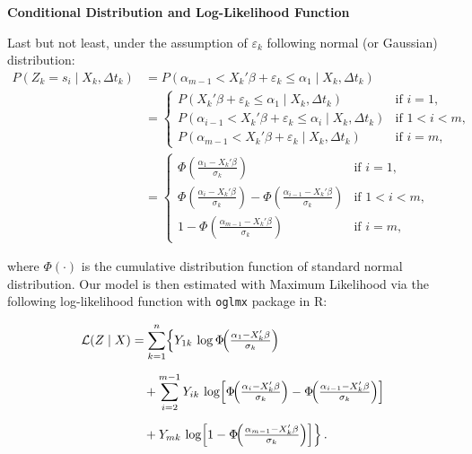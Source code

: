 {\noindent\bfseries Conditional Distribution and Log-Likelihood Function}

Last but not least, under the assumption of \(\varepsilon_k \) following normal (or Gaussian) distribution:
\begin{align}
P(Z_k = s_i \mid X_k, \Delta t_k) &= P(\alpha_{m-1} < X_k'\beta+ \varepsilon_k \leq \alpha_1 \mid X_k, \Delta t_k) \\
&=
\begin{cases}
P(X_k' \beta + \varepsilon_k \leq \alpha_1 \mid X_k, \Delta t_k) & \text{if } i = 1, \\
P(\alpha_{i-1} < X_k' \beta + \varepsilon_k \leq \alpha_i \mid X_k, \Delta t_k) & \text{if } 1<i<m, \\
P(\alpha_{m-1} < X_k' \beta + \varepsilon_k \mid X_k, \Delta t_k) & \text{if } i = m,
\end{cases} \\
&=
\begin{cases}
\Phi\left( \frac{\alpha_1 - X_k' \beta}{\sigma_k} \right) & \text{if } i = 1, \\
\Phi\left( \frac{\alpha_i - X_k' \beta}{\sigma_k} \right) - \Phi\left( \frac{\alpha_{i-1} - X_k' \beta}{\sigma_k} \right) & \text{if } 1<i<m, \\
1 - \Phi\left( \frac{\alpha_{m-1} - X_k' \beta}{\sigma_k} \right) & \text{if } i=m,
\end{cases}
\label{eq:8}
\end{align}

where \(\Phi(\cdot)\) is the cumulative distribution function of standard normal distribution. Our model is then estimated with Maximum Likelihood via the following log-likelihood function with \verb|oglmx| package in R:

\begin{equation}
\label{eq:9}
\begin{split}
\mathcal{L}(Z \mid X)
&= \sum_{k=1}^n \Bigl\{
     Y_{1k}\,\log\Phi\!\Bigl(\tfrac{\alpha_1 - X_k'\beta}{\sigma_k}\Bigr) \\[6pt]
&\quad
   + \sum_{i=2}^{m-1} Y_{ik}\,\log\Bigl[
       \Phi\!\Bigl(\tfrac{\alpha_i - X_k'\beta}{\sigma_k}\Bigr)
     - \Phi\!\Bigl(\tfrac{\alpha_{i-1} - X_k'\beta}{\sigma_k}\Bigr)
     \Bigr] \\[6pt]
&\quad
   + Y_{mk}\,\log\Bigl[
       1 - \Phi\!\Bigl(\tfrac{\alpha_{m-1} - X_k'\beta}{\sigma_k}\Bigr)
     \Bigr]
 \Bigr\}\,.
\end{split}
\end{equation}






